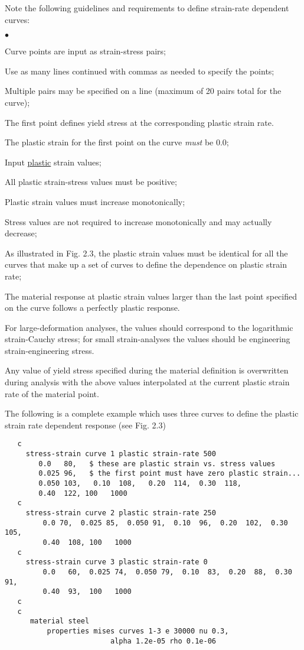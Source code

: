 \documentclass[11pt]{report}
\numberwithin{equation}{section}
\newcommand{\nin} {\noindent}
\newcommand{\ul} {\underline}
\newcommand{\ti}{\emph}
\newcommand{\squishlist}{
 \begin{list}{$\bullet$}
  { \setlength{\itemsep}{0pt}
     \setlength{\parsep}{3pt}
     \setlength{\topsep}{3pt}
     \setlength{\partopsep}{0pt}
     \setlength{\leftmargin}{1.5em}
     \setlength{\labelwidth}{1em}
     \setlength{\labelsep}{0.5em} } }
\newcommand{\squishend}{
  \end{list}  }
\begin{document}
\nin Note the following guidelines and requirements to define strain-rate dependent
curves:
\small \squishlist
\item Curve points are input as strain-stress pairs;
\item Use as many lines continued with commas as needed to specify the points;
\item Multiple pairs may be specified on a line (maximum of 20 pairs total for
the curve);
\item The first point defines yield stress at the corresponding plastic strain
rate. 
\item The plastic strain for the first point on the curve \ti{must} be 0.0;
\item Input \ul{plastic} strain values;
\item All plastic strain-stress values must be positive;
\item Plastic strain values must increase monotonically;
\item Stress values are not required to increase monotonically and may
actually decrease;
\item As illustrated in Fig.  2.3, the plastic strain values must be identical
for all the curves that make up a set of curves to define the dependence on
plastic strain rate;
\item The material response at plastic strain values larger than the last
point specified on the curve follows a perfectly plastic response.
\squishend \normalsize

For large-deformation analyses, the values should correspond to the logarithmic
strain-Cauchy stress; for small strain-analyses the values should be engineering
strain-engineering stress. 

Any value of yield stress specified during the material definition is
overwritten during analysis with the above values interpolated at the current
plastic strain rate of the material point.

The following is a complete example which uses three curves to define the
plastic strain rate dependent response (see Fig. 2.3)
\small
\begin{verbatim}
   c
     stress-strain curve 1 plastic strain-rate 500
        0.0   80,   $ these are plastic strain vs. stress values
        0.025 96,   $ the first point must have zero plastic strain...
        0.050 103,   0.10  108,   0.20  114,  0.30  118, 
        0.40  122, 100   1000
   c
     stress-strain curve 2 plastic strain-rate 250
         0.0 70,  0.025 85,  0.050 91,  0.10  96,  0.20  102,  0.30  105,  
         0.40  108, 100   1000
   c
     stress-strain curve 3 plastic strain-rate 0
         0.0   60,  0.025 74,  0.050 79,  0.10  83,  0.20  88,  0.30  91,   
         0.40  93,  100   1000
   c 
   c 
      material steel
          properties mises curves 1-3 e 30000 nu 0.3,
                         alpha 1.2e-05 rho 0.1e-06
\end{verbatim} \normalsize
\end{document}
